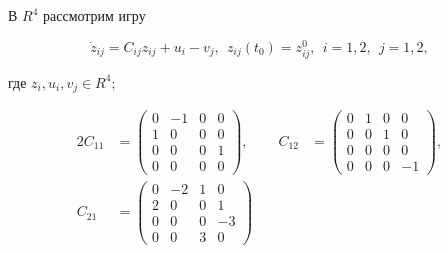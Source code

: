 \begin{examnonum}


В $R^4 $ рассмотрим игру


\begin{equation}


\Dot z_{ij} = C_{ij}z_{ij} + u_i - v_j, \ \


z_{ij}(t_0) =z_{ij}^0, \ \ i=1,2, \ \ j=1,2,


\end{equation}


где $z_i, u_i, v_j \in R^4;$


\begin{alignat*}{2}


C_{11} &=


\begin{pmatrix}


0 & -1 & 0 & 0 \\


1 & 0 & 0 & 0 \\


0 & 0 & 0 & 1 \\


0 & 0 & 0 & 0


\end{pmatrix}


, &\quad 


C_{12} &=


\begin{pmatrix}


0 & 1 & 0 & 0 \\


0 & 0 & 1 & 0 \\


0 & 0 & 0 & 0 \\


0 & 0 & 0 & -1 


\end{pmatrix}


,\\


%


C_{21} &= 


\begin{pmatrix}


0 & -2 & 1 & 0 \\


2 & 0 & 0 & 1 \\


0 & 0 & 0 & -3 \\


0 & 0 & 3 & 0


\end{pmatrix}



\end{alignat*}
\end{examnonum}
